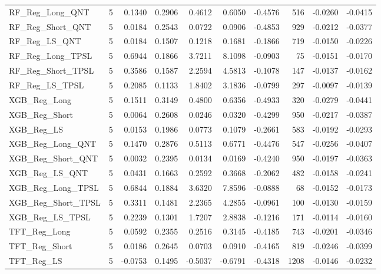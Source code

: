 \begin{tabular}{llrrrrrrrr}
\cline{1-10}
RF\_Reg\_Long\_QNT & 5 & 0.1340 & 0.2906 & 0.4612 & 0.6050 & -0.4576 & 516 & -0.0260 & -0.0415 \\
\cline{1-10}
RF\_Reg\_Short\_QNT & 5 & 0.0184 & 0.2543 & 0.0722 & 0.0906 & -0.4853 & 929 & -0.0212 & -0.0377 \\
\cline{1-10}
RF\_Reg\_LS\_QNT & 5 & 0.0184 & 0.1507 & 0.1218 & 0.1681 & -0.1866 & 719 & -0.0150 & -0.0226 \\
\cline{1-10}
RF\_Reg\_Long\_TPSL & 5 & 0.6944 & 0.1866 & 3.7211 & 8.1098 & -0.0903 & 75 & -0.0151 & -0.0170 \\
\cline{1-10}
RF\_Reg\_Short\_TPSL & 5 & 0.3586 & 0.1587 & 2.2594 & 4.5813 & -0.1078 & 147 & -0.0137 & -0.0162 \\
\cline{1-10}
RF\_Reg\_LS\_TPSL & 5 & 0.2085 & 0.1133 & 1.8402 & 3.1836 & -0.0799 & 297 & -0.0097 & -0.0139 \\
\cline{1-10}
XGB\_Reg\_Long & 5 & 0.1511 & 0.3149 & 0.4800 & 0.6356 & -0.4933 & 320 & -0.0279 & -0.0441 \\
\cline{1-10}
XGB\_Reg\_Short & 5 & 0.0064 & 0.2608 & 0.0246 & 0.0320 & -0.4299 & 950 & -0.0217 & -0.0387 \\
\cline{1-10}
XGB\_Reg\_LS & 5 & 0.0153 & 0.1986 & 0.0773 & 0.1079 & -0.2661 & 583 & -0.0192 & -0.0293 \\
\cline{1-10}
XGB\_Reg\_Long\_QNT & 5 & 0.1470 & 0.2876 & 0.5113 & 0.6771 & -0.4476 & 547 & -0.0256 & -0.0407 \\
\cline{1-10}
XGB\_Reg\_Short\_QNT & 5 & 0.0032 & 0.2395 & 0.0134 & 0.0169 & -0.4240 & 950 & -0.0197 & -0.0363 \\
\cline{1-10}
XGB\_Reg\_LS\_QNT & 5 & 0.0431 & 0.1663 & 0.2592 & 0.3668 & -0.2062 & 482 & -0.0158 & -0.0241 \\
\cline{1-10}
XGB\_Reg\_Long\_TPSL & 5 & 0.6844 & 0.1884 & 3.6320 & 7.8596 & -0.0888 & 68 & -0.0152 & -0.0173 \\
\cline{1-10}
XGB\_Reg\_Short\_TPSL & 5 & 0.3311 & 0.1481 & 2.2365 & 4.2855 & -0.0961 & 100 & -0.0130 & -0.0159 \\
\cline{1-10}
XGB\_Reg\_LS\_TPSL & 5 & 0.2239 & 0.1301 & 1.7207 & 2.8838 & -0.1216 & 171 & -0.0114 & -0.0160 \\
\cline{1-10}
TFT\_Reg\_Long & 5 & 0.0592 & 0.2355 & 0.2516 & 0.3145 & -0.4185 & 743 & -0.0201 & -0.0346 \\
\cline{1-10}
TFT\_Reg\_Short & 5 & 0.0186 & 0.2645 & 0.0703 & 0.0910 & -0.4165 & 819 & -0.0246 & -0.0399 \\
\cline{1-10}
TFT\_Reg\_LS & 5 & -0.0753 & 0.1495 & -0.5037 & -0.6791 & -0.4318 & 1208 & -0.0146 & -0.0232 \\

\end{tabular}
